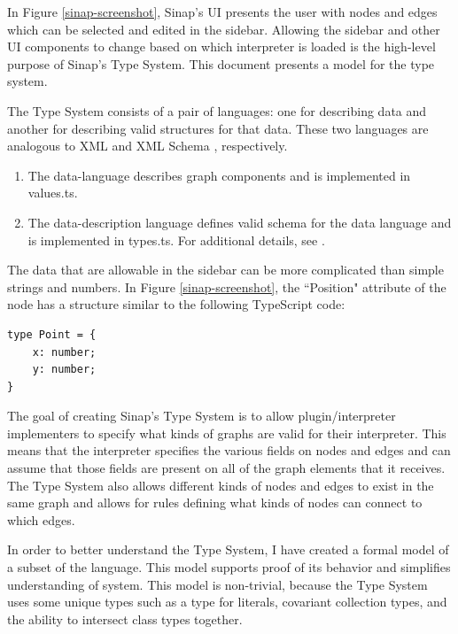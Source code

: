 \documentclass[12pt]{article}
\begin{document}
In Figure \ref{sinap-screenshot}, Sinap's UI
presents the user with nodes and edges which can be selected 
and edited in the sidebar. Allowing the sidebar and other UI components to change based
on which interpreter is loaded is the high-level purpose of Sinap's Type System. 
This document presents a model for the type system. 

The Type System consists of a pair of languages:
one for describing data and another for describing valid structures
for that data. These two languages are analogous to XML and XML Schema
\cite{Thompson:12:WXS}, respectively.

\begin{enumerate}
    \item The data-language describes graph components and is
    implemented in values.ts.
    \item The data-description language defines valid schema 
    for the data language and is implemented in types.ts. 
    For additional details, see \cite{sinap-types-code}.
\end{enumerate}

The data that are allowable in the sidebar can be more complicated than
simple strings and numbers. In Figure \ref{sinap-screenshot}, the ``Position" attribute
of the node has a structure similar to the following TypeScript code:

\vspace{1ex}

\linespread{1}
\begin{verbatim}
type Point = {
    x: number;
    y: number;
}
\end{verbatim}

The goal of creating Sinap's Type System is to allow plugin/interpreter
implementers to specify what 
kinds of graphs are valid for their interpreter. This means that 
the interpreter specifies the various fields on nodes and edges 
and can assume that those fields are present on all of the graph elements
that it receives. The Type System also allows different kinds of nodes and 
edges to exist in the same graph and allows for rules defining what kinds of
nodes can connect to which edges. 

In order to better understand the Type System, I have created a 
formal model of a subset of the language. This model supports proof of
its behavior and simplifies understanding of system. This model 
is non-trivial, because the Type System uses some unique types 
such as a type for literals, covariant collection types, and the
ability to intersect class types together. 
\end{document}
